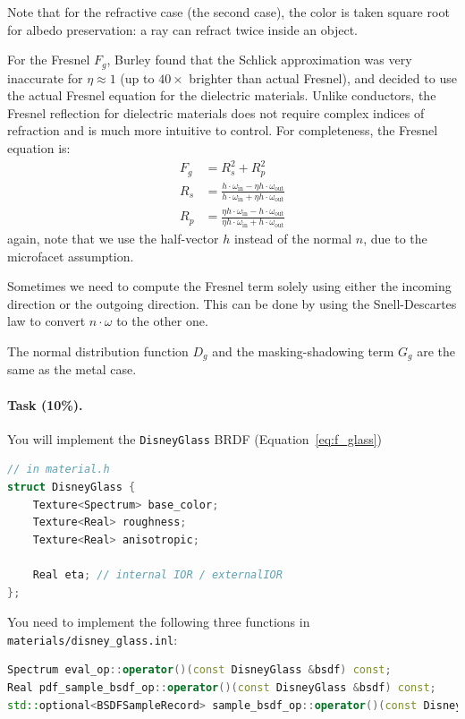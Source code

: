 Note that for the refractive case (the second case), the color is taken square root for albedo preservation: a ray can refract twice inside an object.

For the Fresnel $F_g$, Burley found that the Schlick approximation was very inaccurate for $\eta \approx 1$ (up to $40 \times$ brighter than actual Fresnel), and decided to use the actual Fresnel equation for the dielectric materials. Unlike conductors, the Fresnel reflection for dielectric materials does not require complex indices of refraction and is much more intuitive to control. For completeness, the Fresnel equation is:
\begin{equation}
\begin{aligned}
F_g &= R_s^2 + R_p^2 \\
R_s &= \frac{h \cdot \omega_{\text{in}} - \eta h \cdot \omega_{\text{out}}}{h \cdot \omega_{\text{in}} + \eta h \cdot \omega_{\text{out}}} \\
R_p &= \frac{\eta h \cdot \omega_{\text{in}} - h \cdot \omega_{\text{out}}}{\eta h \cdot \omega_{\text{in}} + h \cdot \omega_{\text{out}}}
\end{aligned}
\end{equation}
again, note that we use the half-vector $h$ instead of the normal $n$, due to the microfacet assumption.

Sometimes we need to compute the Fresnel term solely using either the incoming direction or the outgoing direction. This can be done by using the Snell-Descartes law to convert $n \cdot \omega$ to the other one.

The normal distribution function $D_g$ and the masking-shadowing term $G_g$ are the same as the metal case.

\paragraph{Task (10\%).} You will implement the \lstinline{DisneyGlass} BRDF (Equation~\ref{eq:f_glass})
\begin{lstlisting}[language=c++]
// in material.h
struct DisneyGlass {
    Texture<Spectrum> base_color;
    Texture<Real> roughness;
    Texture<Real> anisotropic;

    Real eta; // internal IOR / externalIOR
};
\end{lstlisting}

You need to implement the following three functions in \lstinline{materials/disney_glass.inl}:
\begin{lstlisting}[language=c++]
Spectrum eval_op::operator()(const DisneyGlass &bsdf) const;
Real pdf_sample_bsdf_op::operator()(const DisneyGlass &bsdf) const;
std::optional<BSDFSampleRecord> sample_bsdf_op::operator()(const DisneyGlass &bsdf) const;
\end{lstlisting}

